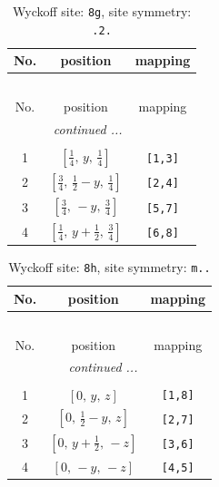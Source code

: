 \documentclass[fleqn,8pt]{jsarticle}
\begin{document}
\begin{longtable}{ccc}
\caption{Wyckoff site: {\tt 8g}, site symmetry: {\tt .2.}}
 \\
 \hline \hline
No. & position & mapping \\ \hline \endfirsthead

\multicolumn{2}{l}{\tablename\ \thetable{}} \\
 \hline \hline
No. & position & mapping \\ \hline \endhead

 \hline \hline
\multicolumn{2}{r}{\footnotesize\it continued ...} \\ \endfoot

 \hline \hline
\multicolumn{2}{r}{} \\ \endlastfoot

1 & $\left[ \frac{1}{4},\, y,\, \frac{1}{4} \right]$ & {\tt [1,3]} \\ \hline
2 & $\left[ \frac{3}{4},\, \frac{1}{2} - y,\, \frac{1}{4} \right]$ & {\tt [2,4]} \\ \hline
3 & $\left[ \frac{3}{4},\, - y,\, \frac{3}{4} \right]$ & {\tt [5,7]} \\ \hline
4 & $\left[ \frac{1}{4},\, y + \frac{1}{2},\, \frac{3}{4} \right]$ & {\tt [6,8]} \\
\end{longtable}
\renewcommand{\arraystretch}{1.2}
\begin{longtable}{ccc}
\caption{Wyckoff site: {\tt 8h}, site symmetry: {\tt m..}}
 \\
 \hline \hline
No. & position & mapping \\ \hline \endfirsthead

\multicolumn{2}{l}{\tablename\ \thetable{}} \\
 \hline \hline
No. & position & mapping \\ \hline \endhead

 \hline \hline
\multicolumn{2}{r}{\footnotesize\it continued ...} \\ \endfoot

 \hline \hline
\multicolumn{2}{r}{} \\ \endlastfoot

1 & $\left[ 0,\, y,\, z \right]$ & {\tt [1,8]} \\ \hline
2 & $\left[ 0,\, \frac{1}{2} - y,\, z \right]$ & {\tt [2,7]} \\ \hline
3 & $\left[ 0,\, y + \frac{1}{2},\, - z \right]$ & {\tt [3,6]} \\ \hline
4 & $\left[ 0,\, - y,\, - z \right]$ & {\tt [4,5]} \\
\end{longtable}
\end{document}
